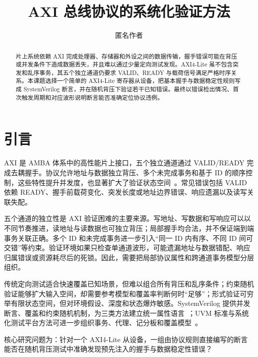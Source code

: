 \documentclass[sigconf,nonacm]{acmart}
\begin{document}
\title{AXI 总线协议的系统化验证方法}
\author{匿名作者}
\renewcommand{\shortauthors}{AXI 总线协议的系统化验证方法\hfill 数字集成电路（2026秋）}

\begin{abstract}
片上系统依赖 AXI 完成处理器、存储器和外设之间的数据传输，握手错误可能在背压或并发条件下造成数据丢失，并且难以通过少量定向测试发现。AXI4-Lite 虽不包含突发和乱序事务，其五个独立通道仍要求 VALID、READY 与载荷信号满足严格时序关系。本课题选择一个简单的 AXI4-Lite 寄存器从设备，把基本握手与数据稳定性规则写成 SystemVerilog 断言，并在随机背压下验证若干已知错误。最终以错误检出情况、首次触发周期和对应波形说明断言能否准确定位协议违例。
\end{abstract}

\maketitle
\thispagestyle{plain}
\fontsize{10pt}{12pt}\selectfont

\section{引言}
AXI 是 AMBA 体系中的高性能片上接口，五个独立通道通过 VALID/READY 完成去耦握手。协议允许地址与数据独立背压、多个未完成事务和基于 ID 的顺序控制，这些特性提升并发度，也显著扩大了验证状态空间~\cite{arm2020axi}。常见错误包括 VALID 依赖 READY、握手前载荷变化、突发长度或地址边界错误、响应遗漏以及读写关联失配。

五个通道的独立性是 AXI 验证困难的主要来源。写地址、写数据和写响应可以以不同节奏推进，读地址与读数据也可独立背压；局部握手均合法，并不保证端到端事务关联正确。多个 ID 和未完成事务进一步引入“同一 ID 内有序、不同 ID 间可交错”等约束。验证环境如果只检查单通道波形，可能遗漏地址与数据错配、响应归属错误或资源耗尽后的死锁。因此，需要把局部协议属性和跨通道事务模型分层组织。

传统定向测试适合快速覆盖已知场景，但难以组合所有背压和乱序条件；约束随机验证能够扩大输入空间，却需要参考模型和覆盖率判断何时“足够”；形式验证可穷举有限状态空间，但对环境假设、深度和状态爆炸敏感。SystemVerilog 提供并发断言、覆盖和约束随机机制，为三类方法建立统一属性语言~\cite{ieee2017sv,foster2009abv}；UVM 标准与系统化测试平台方法可进一步组织事务、代理、记分板和覆盖模型~\cite{ieee2020uvm,bergeron2006testbenches}。

核心研究问题为：针对一个 AXI4-Lite 从设备，一组由协议规则直接编写的断言能否在随机背压测试中准确发现预先注入的握手与数据稳定性错误？
\end{document}

